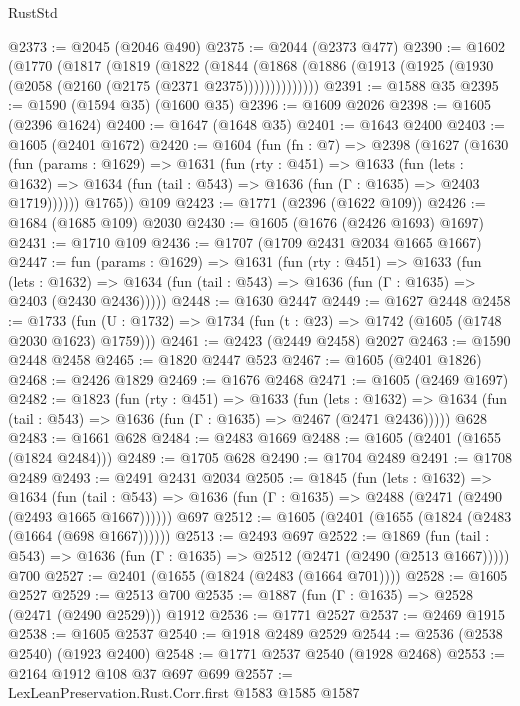 \begin{lexlean}{RustStd}
\begin{coremodule}
{\begin{coremodule}
{{{{{{{{{{{{{{@2373 := @2045 (@2046 @490)
@2375 := @2044 (@2373 @477)
@2390 := @1602
    (@1770
      (@1817
        (@1819
          (@1822
            (@1844
              (@1868 (@1886 (@1913 (@1925 (@1930 (@2058 (@2160 (@2175 (@2371 @2375))))))))))))))
@2391 := @1588 @35
@2395 := @1590 (@1594 @35) (@1600 @35)
@2396 := @1609 @2026
@2398 := @1605 (@2396 @1624)
@2400 := @1647 (@1648 @35)
@2401 := @1643 @2400
@2403 := @1605 (@2401 @1672)
@2420 := @1604
    (fun (fn : @7) =>
    @2398
      (@1627
        (@1630
          (fun (params : @1629) =>
          @1631
            (fun (rty : @451) =>
            @1633
              (fun (lets : @1632) =>
              @1634 (fun (tail : @543) => @1636 (fun (Γ : @1635) => @2403 @1719))))))
        @1765))
    @109
@2423 := @1771 (@2396 (@1622 @109))
@2426 := @1684 (@1685 @109) @2030
@2430 := @1605 (@1676 (@2426 @1693) @1697)
@2431 := @1710 @109
@2436 := @1707 (@1709 @2431 @2034 @1665 @1667)
@2447 := fun (params : @1629) =>
  @1631
    (fun (rty : @451) =>
    @1633
      (fun (lets : @1632) =>
      @1634 (fun (tail : @543) => @1636 (fun (Γ : @1635) => @2403 (@2430 @2436)))))
@2448 := @1630 @2447
@2449 := @1627 @2448
@2458 := @1733 (fun (U : @1732) => @1734 (fun (t : @23) => @1742 (@1605 (@1748 @2030 @1623) @1759)))
@2461 := @2423 (@2449 @2458) @2027
@2463 := @1590 @2448 @2458
@2465 := @1820 @2447 @523
@2467 := @1605 (@2401 @1826)
@2468 := @2426 @1829
@2469 := @1676 @2468
@2471 := @1605 (@2469 @1697)
@2482 := @1823
    (fun (rty : @451) =>
    @1633
      (fun (lets : @1632) =>
      @1634 (fun (tail : @543) => @1636 (fun (Γ : @1635) => @2467 (@2471 @2436)))))
    @628
@2483 := @1661 @628
@2484 := @2483 @1669
@2488 := @1605 (@2401 (@1655 (@1824 @2484)))
@2489 := @1705 @628
@2490 := @1704 @2489
@2491 := @1708 @2489
@2493 := @2491 @2431 @2034
@2505 := @1845
    (fun (lets : @1632) =>
    @1634
      (fun (tail : @543) => @1636 (fun (Γ : @1635) => @2488 (@2471 (@2490 (@2493 @1665 @1667))))))
    @697
@2512 := @1605 (@2401 (@1655 (@1824 (@2483 (@1664 (@698 @1667))))))
@2513 := @2493 @697
@2522 := @1869
    (fun (tail : @543) => @1636 (fun (Γ : @1635) => @2512 (@2471 (@2490 (@2513 @1667)))))
    @700
@2527 := @2401 (@1655 (@1824 (@2483 (@1664 @701))))
@2528 := @1605 @2527
@2529 := @2513 @700
@2535 := @1887 (fun (Γ : @1635) => @2528 (@2471 (@2490 @2529))) @1912
@2536 := @1771 @2527
@2537 := @2469 @1915
@2538 := @1605 @2537
@2540 := @1918 @2489 @2529
@2544 := @2536 (@2538 @2540) (@1923 @2400)
@2548 := @1771 @2537 @2540 (@1928 @2468)
@2553 := @2164 @1912 @108 @37 @697 @699
@2557 := LexLeanPreservation.Rust.Corr.first @1583 @1585 @1587
}}}}}}}}}}}}}}
\end{coremodule}}
\end{coremodule}
\end{lexlean}
